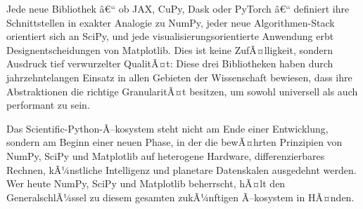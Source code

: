 \documentclass[12pt, a4paper]{article}
\begin{document}
Jede neue Bibliothek â€“ ob JAX, CuPy, Dask oder PyTorch â€“ definiert ihre
Schnittstellen in exakter Analogie zu NumPy, jeder neue Algorithmen-Stack
orientiert sich an SciPy, und jede visualisierungsorientierte Anwendung
erbt Designentscheidungen von Matplotlib. Dies ist keine ZufÃ¤lligkeit,
sondern Ausdruck tief verwurzelter QualitÃ¤t: Diese drei Bibliotheken haben
durch jahrzehntelangen Einsatz in allen Gebieten der Wissenschaft bewiesen,
dass ihre Abstraktionen die richtige GranularitÃ¤t besitzen, um sowohl
universell als auch performant zu sein.

Das Scientific-Python-Ã–kosystem steht nicht am Ende einer Entwicklung,
sondern am Beginn einer neuen Phase, in der die bewÃ¤hrten Prinzipien von
NumPy, SciPy und Matplotlib auf heterogene Hardware, differenzierbares
Rechnen, kÃ¼nstliche Intelligenz und planetare Datenskalen ausgedehnt werden.
Wer heute NumPy, SciPy und Matplotlib beherrscht, hÃ¤lt den
GeneralschlÃ¼ssel zu diesem gesamten zukÃ¼nftigen Ã–kosystem in HÃ¤nden.

\end{document}
